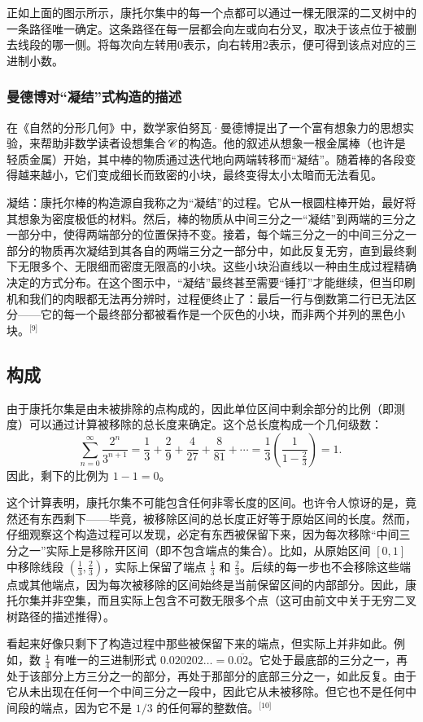 正如上面的图示所示，康托尔集中的每一个点都可以通过一棵无限深的二叉树中的一条路径唯一确定。这条路径在每一层都会向左或向右分叉，取决于该点位于被删去线段的哪一侧。将每次向左转用0表示，向右转用2表示，便可得到该点对应的三进制小数。
\subsubsection{曼德博对“凝结”式构造的描述}
在《自然的分形几何》中，数学家伯努瓦·曼德博提出了一个富有想象力的思想实验，来帮助非数学读者设想集合 𝒞 的构造。他的叙述从想象一根金属棒（也许是轻质金属）开始，其中棒的物质通过迭代地向两端转移而“凝结”。随着棒的各段变得越来越小，它们变成细长而致密的小块，最终变得太小太暗而无法看见。

凝结：康托尔棒的构造源自我称之为“凝结”的过程。它从一根圆柱棒开始，最好将其想象为密度极低的材料。然后，棒的物质从中间三分之一“凝结”到两端的三分之一部分中，使得两端部分的位置保持不变。接着，每个端三分之一的中间三分之一部分的物质再次凝结到其各自的两端三分之一部分中，如此反复无穷，直到最终剩下无限多个、无限细而密度无限高的小块。这些小块沿直线以一种由生成过程精确决定的方式分布。在这个图示中，“凝结”最终甚至需要“锤打”才能继续，但当印刷机和我们的肉眼都无法再分辨时，过程便终止了：最后一行与倒数第二行已无法区分——它的每一个最终部分都被看作是一个灰色的小块，而非两个并列的黑色小块。\(^\text{[9]}\)
\subsection{构成}
由于康托尔集是由未被排除的点构成的，因此单位区间中剩余部分的比例（即测度）可以通过计算被移除的总长度来确定。这个总长度构成一个几何级数：
$$
\sum_{n=0}^{\infty} \frac{2^n}{3^{n+1}} = \frac{1}{3} + \frac{2}{9} + \frac{4}{27} + \frac{8}{81} + \cdots = \frac{1}{3} \left( \frac{1}{1 - \frac{2}{3}} \right) = 1.~
$$
因此，剩下的比例为 $1 - 1 = 0$。

这个计算表明，康托尔集不可能包含任何非零长度的区间。也许令人惊讶的是，竟然还有东西剩下——毕竟，被移除区间的总长度正好等于原始区间的长度。然而，仔细观察这个构造过程可以发现，必定有东西被保留下来，因为每次移除“中间三分之一”实际上是移除开区间（即不包含端点的集合）。比如，从原始区间 $[0, 1]$ 中移除线段 $(\frac{1}{3}, \frac{2}{3})$，实际上保留了端点 $\frac{1}{3}$ 和 $\frac{2}{3}$。后续的每一步也不会移除这些端点或其他端点，因为每次被移除的区间始终是当前保留区间的内部部分。因此，康托尔集并非空集，而且实际上包含不可数无限多个点（这可由前文中关于无穷二叉树路径的描述推得）。

看起来好像只剩下了构造过程中那些被保留下来的端点，但实际上并非如此。例如，数 $\frac{1}{4}$ 有唯一的三进制形式 $0.020202\ldots = 0.\overline{02}$。它处于最底部的三分之一，再处于该部分上方三分之一的部分，再处于那部分的底部三分之一，如此反复。由于它从未出现在任何一个中间三分之一段中，因此它从未被移除。但它也不是任何中间段的端点，因为它不是 $1/3$ 的任何幂的整数倍。\(^\text{[10]}\)

